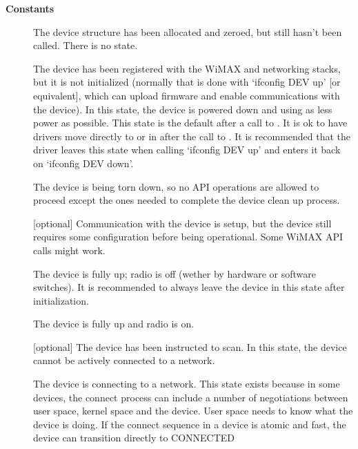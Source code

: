 \documentclass[a4paper,8pt,english]{sphinxmanual}
\begin{document}
\textbf{Constants}
\begin{description}
\item[{}] \leavevmode
The device structure has been allocated and zeroed,
but still {\hyperref[networking/kapi:c.wimax_dev_add]{\emph{}}} hasn't been called. There is no state.

\item[{}] \leavevmode
The device has been registered with the WiMAX and
networking stacks, but it is not initialized (normally that is
done with `ifconfig DEV up' {[}or equivalent{]}, which can upload
firmware and enable communications with the device).
In this state, the device is powered down and using as less
power as possible.
This state is the default after a call to {\hyperref[networking/kapi:c.wimax_dev_add]{\emph{}}}. It
is ok to have drivers move directly to 
or  in  after the call to
{\hyperref[networking/kapi:c.wimax_dev_add]{\emph{}}}.
It is recommended that the driver leaves this state when
calling `ifconfig DEV up' and enters it back on `ifconfig DEV
down'.

\item[{}] \leavevmode
The device is being torn down, so no API
operations are allowed to proceed except the ones needed to
complete the device clean up process.

\item[{}] \leavevmode
{[}optional{]} Communication with the device
is setup, but the device still requires some configuration
before being operational.
Some WiMAX API calls might work.

\item[{}] \leavevmode
The device is fully up; radio is off (wether
by hardware or software switches).
It is recommended to always leave the device in this state
after initialization.

\item[{}] \leavevmode
The device is fully up and radio is on.

\item[{}] \leavevmode
{[}optional{]} The device has been instructed to
scan. In this state, the device cannot be actively connected to
a network.

\item[{}] \leavevmode
The device is connecting to a network. This
state exists because in some devices, the connect process can
include a number of negotiations between user space, kernel
space and the device. User space needs to know what the device
is doing. If the connect sequence in a device is atomic and
fast, the device can transition directly to CONNECTED


\end{description}
\end{document}
